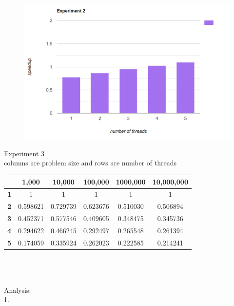 \documentclass[12pt,border=4pt,multi]{article} %
\begin{document}
\begin{figure}[h!]
	\centering
	\includegraphics[width=1.1\textwidth, height=0.9\textwidth]{experiment 2} %
\end{figure}
\newpage
\noindent
Experiment 3\\
columns are problem size and rows are number of threads
{\Large
\begin{center}
\begin{tabular}{|c|c|c|c|c|c|} \hline
 & \textbf{1,000} & \textbf{10,000} & \textbf{100,000} & \textbf{1000,000} & \textbf{10,000,000}\\ \hline
\textbf{1} & 1 & 1 & 1 & 1 & 1\\ \hline
\textbf{2} & 0.598621 & 0.729739 & 0.623676 & 0.510030 & 0.506894\\ \hline
\textbf{3} & 0.452371 & 0.577546 & 0.409605 & 0.348475 & 0.345736\\ \hline
\textbf{4} & 0.294622 & 0.466245 & 0.292497 & 0.265548 & 0.261394\\ \hline
\textbf{5} & 0.174059 & 0.335924 & 0.262023 & 0.222585 & 0.214241\\ \hline
\end{tabular}
\end{center}
}
\leavevmode
\\
\\
\\
Analysis:\\
1.\\
\end{document}
